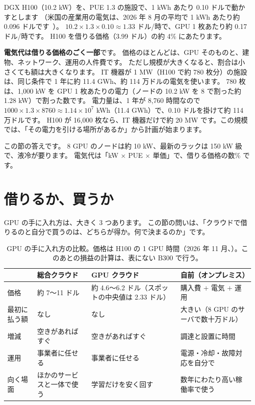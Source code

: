 \begin{example}
DGX H100（10.2 kW）を、PUE 1.3 の施設で、1 kWh あたり 0.10 ドルで動かすとします
（米国の産業用の電気は、2026 年 8 月の平均で 1 kWh あたり約 0.096 ドルです~\cite{eia2026electric}）。
$10.2\times1.3\times0.10\approx1.33$ ドル/時で、GPU 1 枚あたり約 0.17 ドル/時です。
H100 を借りる価格（3.99 ドル）の約 4\% にあたります。
\end{example}

\textbf{電気代は借りる価格のごく一部}です。
価格のほとんどは、GPU そのものと、建物、ネットワーク、運用の人件費です。
ただし規模が大きくなると、割合は小さくても額は大きくなります。
IT 機器が 1 MW（H100 で約 780 枚分）の施設は、同じ条件で 1 年に約 11.4 GWh、約 114 万ドルの電気を使います。
780 枚は、1,000 kW を GPU 1 枚あたりの電力（ノードの 10.2 kW を 8 で割った約 1.28 kW）で割った数です。
電力量は、1 年が 8,760 時間なので $1000\times1.3\times8760\approx1.14\times10^{7}$ kWh（11.4 GWh）で、0.10 ドルを掛けて約 114 万ドルです。
H100 が 16,000 枚なら、IT 機器だけで約 20 MW です。この規模では、「その電力を引ける場所があるか」から計画が始まります。

この節の答えです。
8 GPU のノードは約 10 kW、最新のラックは 150 kW 級で、液冷が要ります。
電気代は「kW $\times$ PUE $\times$ 単価」で、借りる価格の数\% です。

\section{借りるか、買うか}\label{sec:infra-cloud}

GPU の手に入れ方は、大きく 3 つあります。
この節の問いは、「クラウドで借りるのと自分で買うのは、どちらが得か。何で決まるのか」です。

\begin{table}[htbp]
\centering
\caption{GPU の手に入れ方の比較。価格は H100 の 1 GPU 時間（2026 年 11 月、）。このあとの損益の計算は、表にない B300 で行う。}
\label{tab:infra-cloud}
\footnotesize
\begin{tabular}{l>{\raggedright\arraybackslash}p{27mm}>{\raggedright\arraybackslash}p{27mm}>{\raggedright\arraybackslash}p{30mm}}
\toprule
 & 総合クラウド & GPU クラウド & 自前（オンプレミス） \\
\midrule
価格 & 約 7〜11 ドル & 約 4.6〜6.2 ドル（スポットの中央値は 2.33 ドル） & 購入費 $+$ 電気 $+$ 運用 \\
最初に払う額 & なし & なし & 大きい（8 GPU のサーバで数十万ドル） \\
増減 & 空きがあればすぐ & 空きがあればすぐ & 調達と設置に時間 \\
運用 & 事業者に任せる & 事業者に任せる & 電源・冷却・故障対応を自分で \\
向く場面 & ほかのサービスと一体で使う & 学習だけを安く回す & 数年にわたり高い稼働率で使う \\
\bottomrule
\end{tabular}
\end{table}

